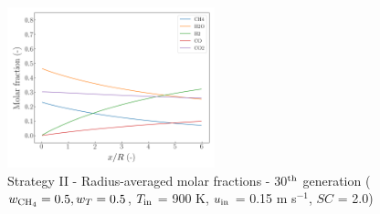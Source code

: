\documentclass[preprint,12pt]{elsarticle}
\begin{document}
\begin{figure}[h!]
\centering
\includegraphics[width=60mm]{results/5Eq/50C_50T/GEN30-AVG.png}
\caption{\label{fig:5RES5050G30-avg} Strategy II - Radius-averaged molar fractions -  30$^{\rm{th}}$ generation ($w_{\rm{CH_4}} = 0.5, w_T = 0.5$, $T_{\rm{in}}$ = 900 K, $u_{\rm{in}}$ = 0.15 m s$^{-1}$, $SC$ = 2.0)}
\end{figure}
\end{document}
